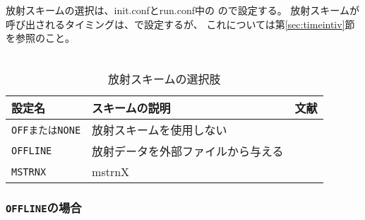 \\


\subsection{\SubsecRadiationSetting} \label{subsec:basic_usel_radiation}
放射スキームの選択は、init.confとrun.conf中の
ので設定する。
放射スキームが呼び出されるタイミングは、で設定するが、
これについては第\ref{sec:timeintiv}節を参照のこと。\\

\\

\begin{table}[h]
\begin{center}
  \caption{放射スキームの選択肢}
  \label{tab:nml_atm_rd}
  \begin{tabularx}{150mm}{lXX} \hline
    \rowcolor[gray]{0.9}  設定名 & スキームの説明 & 文献\\ \hline
      \verb|OFFまたはNONE| & 放射スキームを使用しない & \\
      \verb|OFFLINE|      & 放射データを外部ファイルから与える & \\
      \verb|MSTRNX|       & mstrnX & \citet{sekiguchi_2008} \\
    \hline
  \end{tabularx}
\end{center}
\end{table}


\subsubsection{\texttt{OFFLINE}の場合}

